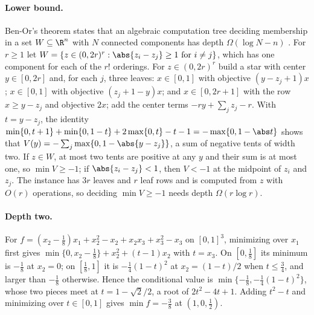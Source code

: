 \paragraph{Lower bound.}
Ben-Or's theorem states that an algebraic computation tree deciding membership
in a set $W\subseteq\R^n$ with $N$ connected components has depth
$\Omega(\log N-n)$ \citep{BenOr1983}. For $r\ge1$ let
$W=\{z\in(0,2r)^r:\abs{z_i-z_j}\ge1\ \text{for}\ i\ne j\}$, which has one component
for each of the $r!$ orderings. For $z\in(0,2r)^r$ build a star with center
$y\in[0,2r]$ and, for each $j$, three leaves: $x\in[0,1]$ with objective
$(y-z_j+1)x$; $x\in[0,1]$ with objective $(z_j+1-y)x$; and $x\in[0,2r+1]$ with
the row $x\ge y-z_j$ and objective $2x$; add the center terms
$-ry+\sum_jz_j-r$. With $t=y-z_j$, the identity
$\min\{0,t+1\}+\min\{0,1-t\}+2\max\{0,t\}-t-1=-\max\{0,1-\abs t\}$ shows that
$V(y)=-\sum_j\max\{0,1-\abs{y-z_j}\}$, a sum of negative tents of width two. If
$z\in W$, at most two tents are positive at any $y$ and their sum is at most
one, so $\min V\ge-1$; if $\abs{z_i-z_j}<1$, then $V<-1$ at the midpoint of $z_i$
and $z_j$. The instance has $3r$ leaves and $r$ leaf rows and is computed from
$z$ with $O(r)$ operations, so deciding $\min V\ge-1$ needs depth
$\Omega(r\log r)$.

\paragraph{Depth two.}
For $f=(x_2-\tfrac18)x_1+x_2^2-x_2+x_2x_3+x_3^2-x_3$ on $[0,1]^3$, minimizing over
$x_1$ first gives $\min\{0,x_2-\tfrac18\}+x_2^2+(t-1)x_2$ with $t=x_3$. On
$[0,\tfrac18]$ its minimum is $-\tfrac18$ at $x_2=0$; on $[\tfrac18,1]$ it is
$-\tfrac14(1-t)^2$ at $x_2=(1-t)/2$ when $t\le\tfrac34$, and larger than $-\tfrac18$
otherwise. Hence the conditional value is $\min\{-\tfrac18,-\tfrac14(1-t)^2\}$,
whose two pieces meet at $t=1-\sqrt2/2$, a root of $2t^2-4t+1$. Adding $t^2-t$
and minimizing over $t\in[0,1]$ gives $\min f=-\tfrac38$ at $(1,0,\tfrac12)$.
